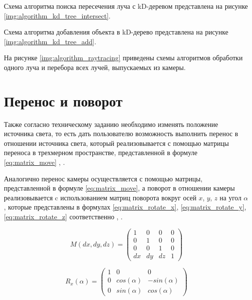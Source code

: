 Схема алгоритма поиска пересечения луча с kD-деревом представлена на рисунке \ref{img:algorithm_kd_tree_intersect}.


Схема алгоритма добавления объекта в kD-дерево представлена на рисунке \ref{img:algorithm_kd_tree_add}.


На рисунке \ref{img:algorithm_raytracing} приведены схемы алгоритмов обработки одного луча и перебора всех лучей, выпускаемых из камеры.


\section{Перенос и поворот}

Также согласно техническому заданию необходимо изменять положение источника света, то есть дать пользователю возможность выполнить перенос в отношении источника света, который реализовывается с помощью матрицы переноса в трехмерном пространстве, представленной в формуле \ref{eq:matrix_move} \cite{куров}, \cite{боресков}.

Аналогично перенос камеры осуществляется с помощью матрицы, представленной в формуле \ref{eq:matrix_move}, а поворот в отношении камеры реализовывается c использованием матриц поворота вокруг осей $x$, $y$, $z$ на угол $\alpha$, которые представлены в формулах \ref{eq:matrix_rotate_x}, \ref{eq:matrix_rotate_y}, \ref{eq:matrix_rotate_z} соответственно \cite{куров}, \cite{боресков}.

\begin{equation}\label{eq:matrix_move}
	M(dx, dy, dz) = \begin{pmatrix}
		1 & 0 & 0 & 0 \\
		0 & 1 & 0 & 0 \\
		0 & 0 & 1 & 0 \\
		dx & dy & dz & 1
	\end{pmatrix}
\end{equation}

\begin{equation}\label{eq:matrix_rotate_x}
	R_x(\alpha) = \begin{pmatrix}
		1 & 0 & 0 \\
		0 & cos(\alpha) & -sin(\alpha) \\
		0 & sin(\alpha) & cos(\alpha)
	\end{pmatrix}
\end{equation}


